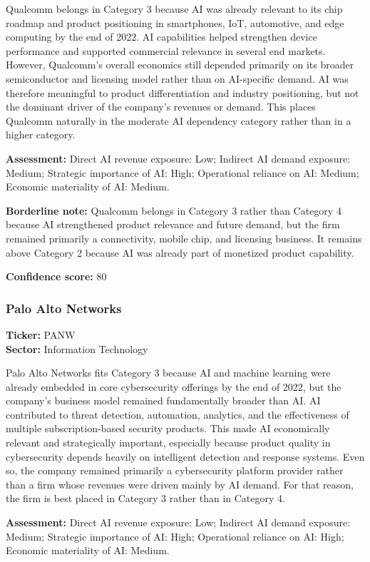 \documentclass{article}
\begin{document}
Qualcomm belongs in Category 3 because AI was already relevant to its chip roadmap and product positioning in smartphones, IoT, automotive, and edge computing by the end of 2022. AI capabilities helped strengthen device performance and supported commercial relevance in several end markets. However, Qualcomm’s overall economics still depended primarily on its broader semiconductor and licensing model rather than on AI-specific demand. AI was therefore meaningful to product differentiation and industry positioning, but not the dominant driver of the company’s revenues or demand. This places Qualcomm naturally in the moderate AI dependency category rather than in a higher category.

\textbf{Assessment:} Direct AI revenue exposure: Low; Indirect AI demand exposure: Medium; Strategic importance of AI: High; Operational reliance on AI: Medium; Economic materiality of AI: Medium.

\textbf{Borderline note:} Qualcomm belongs in Category 3 rather than Category 4 because AI strengthened product relevance and future demand, but the firm remained primarily a connectivity, mobile chip, and licensing business. It remains above Category 2 because AI was already part of monetized product capability.

\textbf{Confidence score:} 80

\subsubsection*{Palo Alto Networks}
\textbf{Ticker:} PANW \\
\textbf{Sector:} Information Technology

Palo Alto Networks fits Category 3 because AI and machine learning were already embedded in core cybersecurity offerings by the end of 2022, but the company’s business model remained fundamentally broader than AI. AI contributed to threat detection, automation, analytics, and the effectiveness of multiple subscription-based security products. This made AI economically relevant and strategically important, especially because product quality in cybersecurity depends heavily on intelligent detection and response systems. Even so, the company remained primarily a cybersecurity platform provider rather than a firm whose revenues were driven mainly by AI demand. For that reason, the firm is best placed in Category 3 rather than in Category 4.

\textbf{Assessment:} Direct AI revenue exposure: Low; Indirect AI demand exposure: Medium; Strategic importance of AI: High; Operational reliance on AI: High; Economic materiality of AI: Medium.
\end{document}

